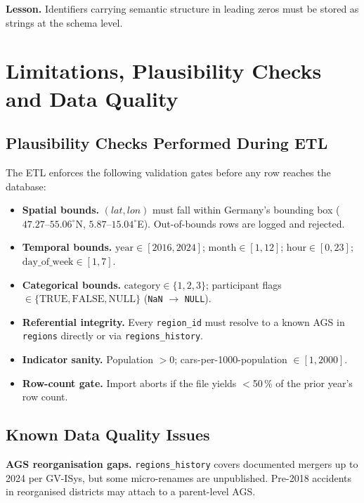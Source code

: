 \documentclass[12pt,a4paper]{article}
\begin{document}
\textbf{Lesson.} Identifiers carrying semantic structure in leading zeros must be stored as strings at the schema level.

\section{Limitations, Plausibility Checks and Data Quality}

\subsection{Plausibility Checks Performed During ETL}

The ETL enforces the following validation gates before any row reaches the database:

\begin{itemize}
  \item \textbf{Spatial bounds.} $(lat, lon)$ must fall within Germany's bounding box
        ($47.27$--$55.06^\circ$N, $5.87$--$15.04^\circ$E). Out-of-bounds rows are logged and rejected.
  \item \textbf{Temporal bounds.} $\text{year} \in [2016, 2024]$; $\text{month} \in [1, 12]$;
        $\text{hour} \in [0, 23]$; $\text{day\_of\_week} \in [1, 7]$.
  \item \textbf{Categorical bounds.} $\text{category} \in \{1, 2, 3\}$; participant flags
        $\in \{\text{TRUE}, \text{FALSE}, \text{NULL}\}$ (\texttt{NaN} $\rightarrow$ \texttt{NULL}).
  \item \textbf{Referential integrity.} Every \texttt{region\_id} must resolve to a known AGS
        in \texttt{regions} directly or via \texttt{regions\_history}.
  \item \textbf{Indicator sanity.} Population $> 0$; cars-per-1000-population $\in [1, 2000]$.
  \item \textbf{Row-count gate.} Import aborts if the file yields $<$50\,\% of the prior year's row count.
\end{itemize}

\subsection{Known Data Quality Issues}

\textbf{AGS reorganisation gaps.} \texttt{regions\_history} covers documented mergers up to 2024 per GV-ISys, but some micro-renames are unpublished. Pre-2018 accidents in reorganised districts may attach to a parent-level AGS.
\end{document}
